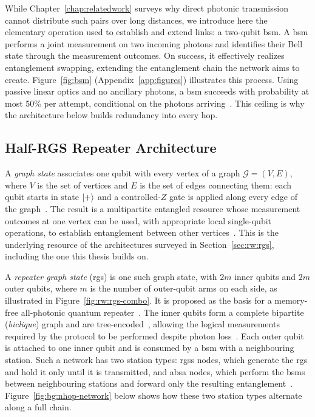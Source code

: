 While Chapter~\ref{chap:relatedwork} surveys why direct photonic transmission cannot distribute such pairs over long distances, we introduce here the elementary operation used to establish and extend links: a two-qubit \Gls{bsm}. A \Gls{bsm} performs a joint measurement on two incoming photons and identifies their Bell state through the measurement outcomes.  On success, it effectively realizes entanglement swapping, extending the entanglement chain the network aims to create. Figure~\ref{fig:bsm} (Appendix~\ref{app:figures}) illustrates this process. Using passive linear optics and no ancillary photons, a \Gls{bsm} succeeds with probability at most 50\% per attempt, conditional on the photons arriving~\cite{Ewert20143,Benchasattabuse2026Bridging}. This ceiling is why the architecture below builds redundancy into every hop.

\subsection{Half-RGS Repeater Architecture}
\label{sec:bg:hrgs}

A \emph{graph state} associates one qubit with every vertex of a graph $\mathcal{G}=(V,E)$, where $V$ is the set of vertices and $E$ is the set of edges connecting them: each qubit starts in state $\ket{+}$ and a controlled-$Z$ gate is applied along every edge of the graph~\cite{Briegel2001Persistent,Raussendorf2003Measurementbased,Hein2004Multiparty,Hein2006Entanglement}. The result is a multipartite entangled resource whose measurement outcomes at one vertex can be used, with appropriate local single-qubit operations, to establish entanglement between other vertices~\cite{Raussendorf2002oneway,Raussendorf2003Measurementbased,Zwerger2012Measurementbased}. This is the underlying resource of the architectures surveyed in Section~\ref{sec:rw:rgs}, including the one this thesis builds on.

A \emph{repeater graph state} (\Gls{rgs}) is one such graph state, with $2m$ inner qubits and $2m$ outer qubits, where $m$ is the number of outer-qubit arms on each side, as illustrated in Figure~\ref{fig:rw:rgs-combo}. It is proposed as the basis for a memory-free all-photonic quantum repeater~\cite{Azuma2015All}. The inner qubits form a complete bipartite (\emph{biclique}) graph and are tree-encoded~\cite{Varnava2006Loss}, allowing the logical measurements required by the protocol to be performed despite photon loss~\cite{Varnava2008How}. Each outer qubit is attached to one inner qubit and is consumed by a \Gls{bsm} with a neighbouring station. Such a network has two station types: \Gls{rgss} nodes, which generate the \Gls{rgs} and hold it only until it is transmitted, and \Gls{absa} nodes, which perform the \Glspl{bsm} between neighbouring stations and forward only the resulting entanglement~\cite{Azuma2015All,Benchasattabuse2026Bridging}. Figure~\ref{fig:bg:nhop-network} below shows how these two station types alternate along a full chain.

